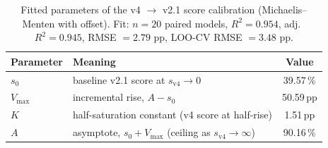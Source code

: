 



\begin{table}[ht]
\centering
\caption{Fitted parameters of the v4 $\rightarrow$ v2.1 score calibration
(Michaelis--Menten with offset). Fit: $n=20$ paired models,
$R^{2}=0.954$, adj.\ $R^{2}=0.945$, RMSE $=2.79$ pp,
LOO-CV RMSE $=3.48$ pp.}
\label{tab:tb-calibration}
\begin{tabular}{@{}llS@{}}
\toprule
Parameter & Meaning & {Value} \\
\midrule
$s_{0}$   & baseline v2.1 score at $s_{\mathrm{v4}}\!\to\!0$ & 39.57\,\% \\
$V_{\max}$ & incremental rise, $A - s_{0}$ & 50.59\,pp \\
$K$       & half-saturation constant (v4 score at half-rise) & 1.51\,pp \\
$A$       & asymptote, $s_{0}+V_{\max}$ (ceiling as $s_{\mathrm{v4}}\!\to\!\infty$) & 90.16\,\% \\
\bottomrule
\end{tabular}
\end{table}
